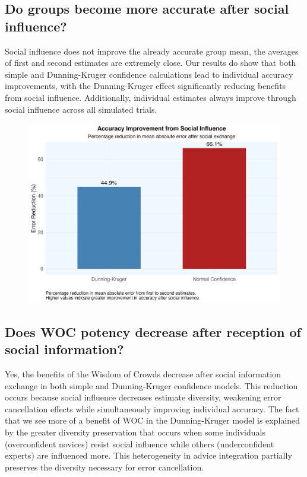 \documentclass[
  man,floatsintext]{apa6}
\begin{document}
\hypertarget{do-groups-become-more-accurate-after-social-influence}{%
\subsection{Do groups become more accurate after social influence?}\label{do-groups-become-more-accurate-after-social-influence}}

Social influence does not improve the already accurate group mean, the averages of first and second estimates are extremely close. Our results do show that both simple and Dunning-Kruger confidence calculations lead to individual accuracy improvements, with the Dunning-Kruger effect significantly reducing benefits from social influence. Additionally, individual estimates always improve through social influence across all simulated trials.

\begin{figure}[H]
\includegraphics[width=7in]{photos/accuracy_improvement} \caption{ }\label{fig:unnamed-chunk-6}
\end{figure}

\hypertarget{does-woc-potency-decrease-after-reception-of-social-information}{%
\subsection{Does WOC potency decrease after reception of social information?}\label{does-woc-potency-decrease-after-reception-of-social-information}}

Yes, the benefits of the Wisdom of Crowds decrease after social information exchange in both simple and Dunning-Kruger confidence models. This reduction occurs because social influence decreases estimate diversity, weakening error cancellation effects while simultaneously improving individual accuracy. The fact that we see more of a benefit of WOC in the Dunning-Kruger model is explained by the greater diversity preservation that occurs when some individuals (overconfident novices) resist social influence while others (underconfident experts) are influenced more. This heterogeneity in advice integration partially preserves the diversity necessary for error cancellation.
\end{document}
